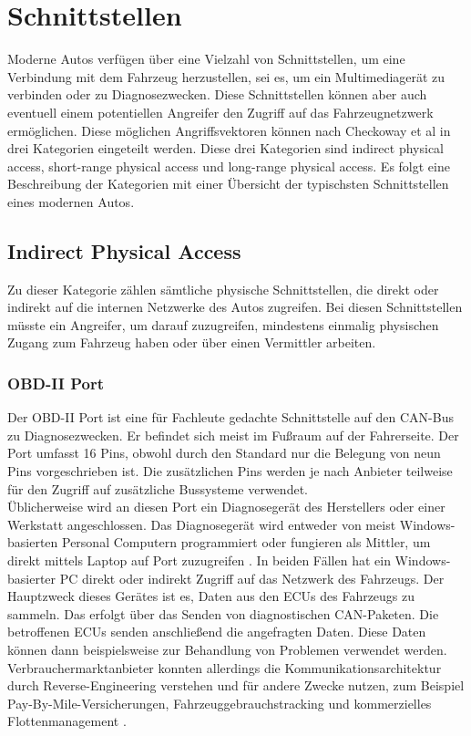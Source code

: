 \section{Schnittstellen}\label{Schnittstellen}
Moderne Autos verfügen über eine Vielzahl von Schnittstellen, um eine Verbindung mit dem Fahrzeug herzustellen, sei es, um ein Multimediagerät zu verbinden oder zu Diagnosezwecken. Diese Schnittstellen können aber auch eventuell einem potentiellen Angreifer den Zugriff auf das Fahrzeugnetzwerk ermöglichen. Diese möglichen Angriffsvektoren können nach Checkoway et al \cite[1]{Checkoway.2011} in drei Kategorien eingeteilt werden. Diese drei Kategorien sind \glqq indirect physical access\grqq , \glqq short-range physical access\grqq{} und \glqq long-range physical access\grqq . Es folgt eine Beschreibung der Kategorien mit einer Übersicht der typischsten Schnittstellen eines modernen Autos.

\subsection{Indirect Physical Access}
Zu dieser Kategorie zählen sämtliche physische Schnittstellen, die direkt oder indirekt auf die internen Netzwerke des Autos zugreifen. Bei diesen Schnittstellen müsste ein Angreifer, um darauf zuzugreifen, mindestens einmalig physischen Zugang zum Fahrzeug haben oder über einen Vermittler arbeiten. 


\subsubsection{OBD-II Port} \label{OBD-II}
Der \ac{OBD}-II Port ist eine für Fachleute gedachte Schnittstelle auf den \acs{CAN}-Bus zu Diagnosezwecken.	Er befindet sich meist im Fußraum auf der Fahrerseite. Der Port umfasst 16 Pins, obwohl durch den Standard nur die Belegung von neun Pins vorgeschrieben ist. Die zusätzlichen Pins werden je nach Anbieter teilweise für den Zugriff auf zusätzliche Bussysteme verwendet. \cite[2]{Klinedinst.2016} \\
Üblicherweise wird an diesen Port ein Diagnosegerät des Herstellers oder einer Werkstatt angeschlossen. Das Diagnosegerät wird entweder von meist Windows-basierten Personal Computern programmiert oder fungieren als Mittler, um direkt mittels Laptop auf Port zuzugreifen \cite[3]{Checkoway.2011}. In beiden Fällen hat ein Windows-basierter PC direkt oder indirekt Zugriff auf das Netzwerk des Fahrzeugs. Der Hauptzweck dieses Gerätes ist es, Daten aus den \acsp{ECU} des Fahrzeugs zu sammeln. Das erfolgt über das Senden von diagnostischen \acs{CAN}-Paketen. Die betroffenen \acsp{ECU} senden anschließend die angefragten Daten. Diese Daten können dann beispielsweise zur Behandlung von Problemen verwendet werden.\\
Verbrauchermarktanbieter konnten allerdings die Kommunikationsarchitektur durch Reverse-Engineering verstehen und für andere Zwecke nutzen, zum Beispiel Pay-By-Mile-Versicherungen, Fahrzeuggebrauchstracking und kommerzielles Flottenmanagement \cite[3]{Klinedinst.2016}. \\

